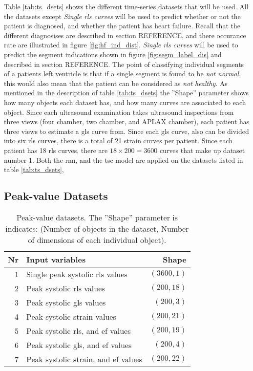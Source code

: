 Table \ref{tab:ts_dsets} shows the different time-series datasets that will be used. 
All the datasets except \textit{Single \acrshort{rls} curves} will be used to predict whether or not the patient is diagnosed, and whether the patient has heart failure.
Recall that the different diagnosises are described in section REFERENCE, and there occurance rate are illustrated in figure \ref{fig:hf_ind_dist}.
\textit{Single \acrshort{rls} curves} will be used to predict the segment indications shown in figure \ref{fig:segm_label_dis} and described in section REFERENCE. 
The point of classifying individual segments of a patients left ventricle is that if a single segment is found to be \textit{not normal}, 
this would also mean that the patient can be considered as \textit{not healthy}.
As mentioned in the description of table \ref{tab:ts_dsets} the ''Shape'' parameter shows how many objects each dataset has, and how many curves are associated to each object. 
Since each ultrasound examination takes ultrasound inspections from three views (four chamber, two chamber, and APLAX chamber), each patient has three views to estimate a \acrshort{gls} curve from. 
Since each \acrshort{gls} curve, also can be divided into six \acrshort{rls} curves, there is a total of 21 strain curves per patient. 
Since each patient has 18 \acrshort{rls} curves, there are $18 \times 200 = 3600$ curves that make up dataset number 1.
Both the \acrshort{rnn}, and the \acrshort{tsc} model are applied on the datasets listed in table \ref{tab:ts_dsets}, 
\bigskip

\subsection{Peak-value Datasets}

\begin{table*}[h]
    \centering
    \begin{tabular}{ rlr }
        \toprule
        Nr & Input variables                     & Shape \\
        \midrule                              
        1  & Single peak systolic \acrshort{rls} values                & $(3600,1)$ \\
        2  & Peak systolic \acrshort{rls} values                       & $(200,18)$ \\
        3  & Peak systolic \acrshort{gls} values                       & $(200,3)$  \\
        4  & Peak systolic strain values                               & $(200,21)$ \\
        5  & Peak systolic \acrshort{rls}, and \acrshort{ef} values    & $(200,19)$ \\
        6  & Peak systolic \acrshort{gls}, and \acrshort{ef} values    & $(200,4)$  \\
        7  & Peak systolic strain, and \acrshort{ef} values            & $(200,22)$ \\
        \bottomrule
    \end{tabular}
    \caption{Peak-value datasets. The ''Shape'' parameter is indicates: (Number of objects in the dataset, Number of dimensions of each individual object).}
    \label{tab:pv_dsets}
\end{table*}

